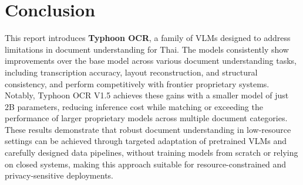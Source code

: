 \documentclass[]{typhoon} %
\begin{document}




\section{Conclusion}

This report introduces \textbf{Typhoon OCR}, a family of VLMs designed to address limitations in document understanding for Thai. The models consistently show improvements over the base model across various document understanding tasks, including transcription accuracy, layout reconstruction, and structural consistency, and perform competitively with frontier proprietary systems. Notably, Typhoon OCR V1.5 achieves these gains with a smaller model of just 2B parameters, reducing inference cost while matching or exceeding the performance of larger proprietary models across multiple document categories. These results demonstrate that robust document understanding in low-resource settings can be achieved through targeted adaptation of pretrained VLMs and carefully designed data pipelines, without training models from scratch or relying on closed systems, making this approach suitable for resource-constrained and privacy-sensitive deployments.
\end{document}
